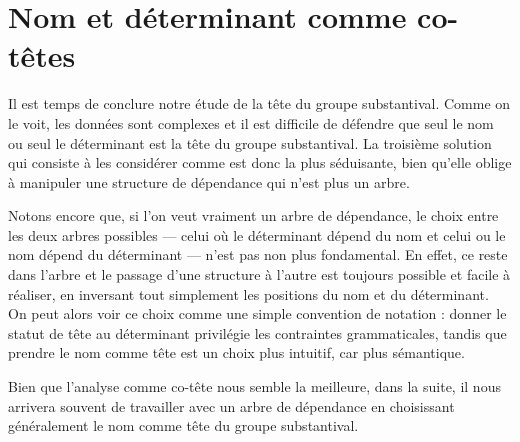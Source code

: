 \section{Nom et déterminant comme co-têtes}\label{sec:3.3.27}

Il est temps de conclure notre étude de la tête du groupe substantival. Comme on le voit, les données sont complexes et il est difficile de défendre que seul le nom ou seul le déterminant est la tête du groupe substantival. La troisième solution qui consiste à les considérer comme  est donc la plus séduisante, bien qu’elle oblige à manipuler une structure de dépendance qui n’est plus un arbre.

Notons encore que, si l’on veut vraiment un arbre de dépendance, le choix entre les deux arbres possibles — celui où le déterminant dépend du nom et celui ou le nom dépend du déterminant — n’est pas non plus fondamental. En effet, ce  reste  dans l’arbre et le passage d’une structure à l’autre est toujours possible et facile à réaliser, en inversant tout simplement les positions du nom et du déterminant. On peut alors voir ce choix comme une simple convention de notation : donner le statut de tête au déterminant privilégie les contraintes grammaticales, tandis que prendre le nom comme tête est un choix plus intuitif, car plus sémantique.

Bien que l’analyse comme co-tête nous semble la meilleure, dans la suite, il nous arrivera souvent de travailler avec un arbre de dépendance en choisissant généralement le nom comme tête du groupe substantival.


